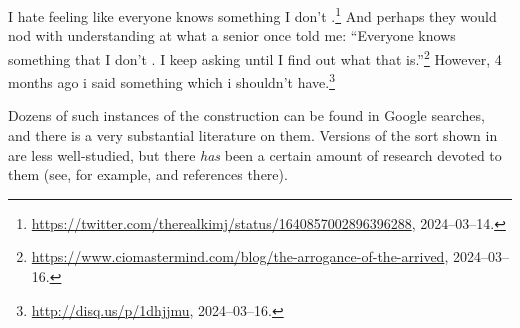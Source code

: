 \documentclass[output=paper,colorlinks,citecolor=brown]{langscibook}
\begin{document}
\begin{exe}
 \ex\label{antecDel}
  \begin{xlist}
 \ex I hate feeling like everyone knows something I don't {\gp}.\footnote{\url{https://twitter.com/therealkimj/status/1640857002896396288}, 2024--03--14.}
 \ex\label{antecDel_a}
    And perhaps they would nod with understanding at what a senior
  once told me: ``Everyone knows something that I don't {\gp}. I keep
  asking until I find out what that is.''\footnote{\url{https://www.ciomastermind.com/blog/the-arrogance-of-the-arrived},  2024--03--16.}
 \ex However, 4 months ago i said something which i shouldn't have.\footnote{\url{http://disq.us/p/1dhjjmu}, 2024--03--16.}
  \end{xlist}
\end{exe}
Dozens of such instances of the construction can be found in Google
searches, and there is a very substantial literature on them. Versions
of the sort shown in  are less well-studied, but
there \emph{has} been a certain amount of research devoted to them (see, for example,
\citet{schuyler2002} and references there).
\end{document}

